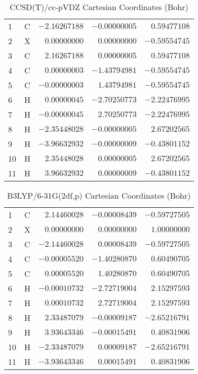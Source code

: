 \documentclass[10pt,oneside]{article}
\begin{document}
\begin{table}[h!]
\centering
\caption{CCSD(T)/cc-pVDZ Cartesian Coordinates (Bohr)}
\begin{tabular}{llrrr}
1  & C  & $-2.16267188$ & $-0.00000005$ & $ 0.59477108$ \\
2  & X  & $ 0.00000000$ & $ 0.00000000$ & $-0.59554745$ \\
3  & C  & $ 2.16267188$ & $ 0.00000005$ & $ 0.59477108$ \\
4  & C  & $ 0.00000003$ & $-1.43794981$ & $-0.59554745$ \\
5  & C  & $-0.00000003$ & $ 1.43794981$ & $-0.59554745$ \\
6  & H  & $ 0.00000045$ & $-2.70250773$ & $-2.22476995$ \\
7  & H  & $-0.00000045$ & $ 2.70250773$ & $-2.22476995$ \\
8  & H  & $-2.35448028$ & $-0.00000005$ & $ 2.67202565$ \\
9  & H  & $-3.96632932$ & $-0.00000009$ & $-0.43801152$ \\
10 & H  & $ 2.35448028$ & $ 0.00000005$ & $ 2.67202565$ \\
11 & H  & $ 3.96632932$ & $ 0.00000009$ & $-0.43801152$ \\
\end{tabular}
\end{table}

\begin{table}[h!]
\centering
\caption{B3LYP/6-31G(2df,p) Cartesian Coordinates (Bohr)}
\begin{tabular}{llrrr}
1  & C  & $ 2.14460028$ & $-0.00008439$ & $-0.59727505$ \\
2  & X  & $ 0.00000000$ & $ 0.00000000$ & $ 1.00000000$ \\
3  & C  & $-2.14460028$ & $ 0.00008439$ & $-0.59727505$ \\
4  & C  & $-0.00005520$ & $-1.40280870$ & $ 0.60490705$ \\
5  & C  & $ 0.00005520$ & $ 1.40280870$ & $ 0.60490705$ \\
6  & H  & $-0.00010732$ & $-2.72719004$ & $ 2.15297593$ \\
7  & H  & $ 0.00010732$ & $ 2.72719004$ & $ 2.15297593$ \\
8  & H  & $ 2.33487079$ & $-0.00009187$ & $-2.65216791$ \\
9  & H  & $ 3.93643346$ & $-0.00015491$ & $ 0.40831906$ \\
10 & H  & $-2.33487079$ & $ 0.00009187$ & $-2.65216791$ \\
11 & H  & $-3.93643346$ & $ 0.00015491$ & $ 0.40831906$ \\
\end{tabular}
\end{table}
\end{document}
